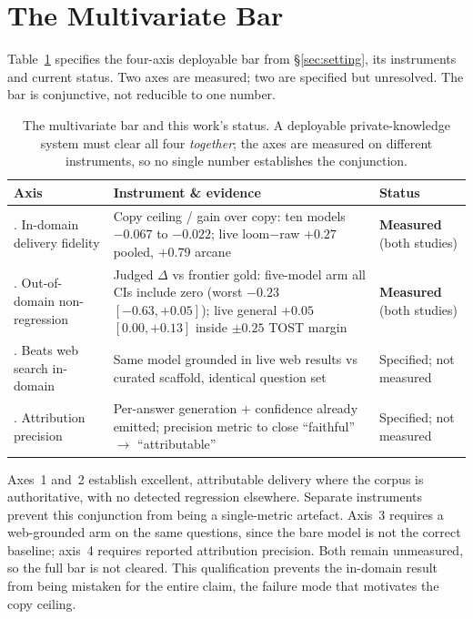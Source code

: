 \documentclass[10pt,twocolumn]{article}
\begin{document}
\section{The Multivariate Bar}\label{sec:bar}
Table~\ref{tab:bar} specifies the four-axis deployable bar from \S\ref{sec:setting}, its instruments and current status. Two axes are measured; two are specified but unresolved. The bar is conjunctive, not reducible to one number.

\begin{table}[t]\centering\small
\caption{The multivariate bar and this work's status. A deployable private-knowledge system must clear
all four \emph{together}; the axes are measured on different instruments, so no single number
establishes the conjunction.}
\label{tab:bar}
\renewcommand{\arraystretch}{1.2}
\begin{tabularx}{\textwidth}{@{}>{\raggedright\arraybackslash}p{3.5cm} >{\raggedright\arraybackslash}X >{\raggedright\arraybackslash}p{3.6cm}@{}}
\toprule
Axis & Instrument \& evidence & Status \\
\midrule
1. In-domain delivery fidelity & Copy ceiling / gain over copy: ten models $-0.067$ to $-0.022$; live loom$-$raw $+0.27$ pooled, $+0.79$ arcane & \textbf{Measured} (both studies) \\
2. Out-of-domain non-regression & Judged $\Delta$ vs frontier gold: five-model arm all CIs include zero (worst $-0.23$ $[-0.63,+0.05]$); live general $+0.05$ $[0.00,+0.13]$ inside $\pm0.25$ TOST margin & \textbf{Measured} (both studies) \\
3. Beats web search in-domain & Same model grounded in live web results vs curated scaffold, identical question set & Specified; not measured \\
4. Attribution precision & Per-answer generation $+$ confidence already emitted; precision metric to close ``faithful'' $\to$ ``attributable'' & Specified; not measured \\
\bottomrule
\end{tabularx}
\end{table}

Axes~1 and~2 establish excellent, attributable delivery where the corpus is authoritative, with no detected regression elsewhere. Separate instruments prevent this conjunction from being a single-metric artefact. Axis~3 requires a web-grounded arm on the same questions, since the bare model is not the correct baseline; axis~4 requires reported attribution precision. Both remain unmeasured, so the full bar is not cleared. This qualification prevents the in-domain result from being mistaken for the entire claim, the failure mode that motivates the copy ceiling.
\end{document}

